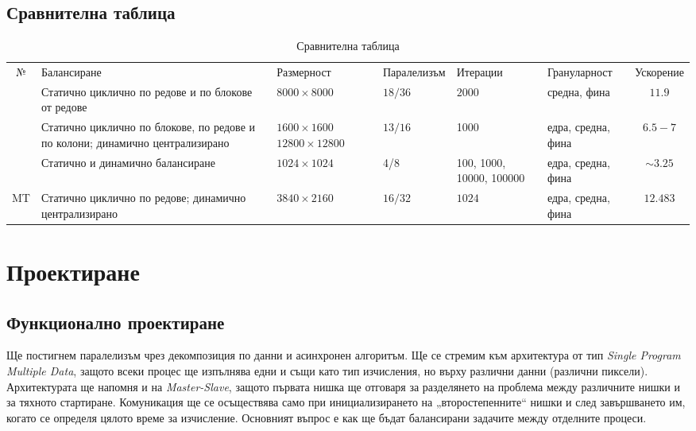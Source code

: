 \documentclass[a4paper,11pt]{article}
\begin{document}
\subsection{Сравнителна таблица}
\begin{table}[H]
    \centering
    \begin{tabularx}{\linewidth}{|c|X|X|X|X|X|c|}
        \hline
        \multirow{2}{*}{№} & \multirow{2}{*}{Балансиране} & \multirow{2}{*}{Размерност} & \multirow{2}{*}{Паралелизъм} & \multirow{2}{*}{Итерации} & \multirow{2}{*}{Грануларност} & \multirow{2}{*}{Ускорение} \\
        & & & & & & \\
        \hline
        [2] & Статично циклично по редове и по блокове от редове & $8000\times8000$ & $18/36$ & $2000$ & средна, фина & $11.9$ \\
        \hline
        [3] & Статично циклично по блокове, по редове и по колони; динамично централизирано & $1600\times1600$ $12800\times12800$ & $13/16$ & 1000 & едра, средна, фина & $6.5-7$ \\
        \hline
        [4] & Статично и динамично балансиране & $1024\times 1024$ & 4/8 & 100, 1000, 10000, 100000 & едра, средна, фина & $\sim3.25$\\
        \hline 
        MT & Статично циклично по редове; динамично централизирано & $3840\times2160$ & $16/32$ & $1024$ & едра, средна, фина & $12.483$\\
        \hline
    \end{tabularx}
    \caption{Сравнителна таблица}
    \label{tab:comparisson-table}
\end{table}

\section{Проектиране}
\subsection{Функционално проектиране}
Ще постигнем паралелизъм чрез декомпозиция по данни и асинхронен алгоритъм. Ще се стремим към архитектура от тип \emph{Single Program Multiple Data}, защото всеки процес ще изпълнява едни и същи като тип изчисления, но върху различни данни (различни пиксели). Архитектурата ще напомня и на \emph{Master-Slave}, защото първата нишка ще отговаря за разделянето на проблема между различните нишки и за тяхното стартиране. Комуникация ще се осъществява само при инициализирането на „второстепенните“ нишки и след завършването им, когато се определя цялото време за изчисление. Основният въпрос е как ще бъдат балансирани задачите между отделните процеси.
\end{document}
